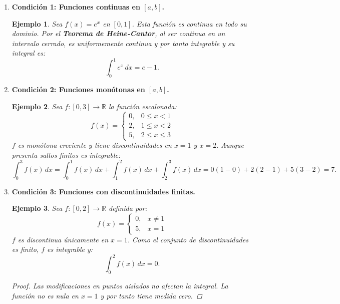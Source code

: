 \documentclass{article}
\newtheorem{ejemplo}{Ejemplo}
\begin{document}
\begin{enumerate}
    \item \textbf{Condición 1: Funciones continuas en \([a, b]\).}
        \begin{ejemplo}
            Sea \( f(x) = e^x \) en \([0, 1]\). Esta función es continua en todo su dominio. Por el \textbf{Teorema de Heine-Cantor}, al ser continua en un intervalo cerrado, es uniformemente continua y por tanto integrable y su integral es:
            \[
            \int_0^1 e^x \, dx = e - 1.
            \]
        \end{ejemplo}
        
    \item \textbf{Condición 2: Funciones monótonas en \([a, b]\).}
        \begin{ejemplo}
            Sea \( f: [0, 3] \to \mathbb{R} \) la función escalonada:
            \[
            f(x) = 
            \begin{cases}
                0, & 0 \leq x < 1 \\
                2, & 1 \leq x < 2 \\
                5, & 2 \leq x \leq 3
            \end{cases}
            \]
            \( f \) es monótona creciente y tiene discontinuidades en \( x = 1 \) y \( x = 2 \). Aunque presenta saltos finitos es integrable:
            \[
            \int_0^3 f(x) \, dx = \int_0^1 f(x) \, dx + \int_1^2 f(x) \, dx + \int_2^3 f(x) \, dx =
            0(1-0) + 2(2-1) + 5(3-2) = 7.
            \]
        \end{ejemplo}

    \item \textbf{Condición 3: Funciones con discontinuidades finitas.}
        \begin{ejemplo}
            Sea \( f: [0, 2] \to \mathbb{R} \) definida por:
            \[
            f(x) = 
            \begin{cases}
                0, & x \neq 1 \\
                5, & x = 1
            \end{cases}
            \]
            \( f \) es discontinua únicamente en \( x = 1 \). Como el conjunto de discontinuidades es finito, \( f \) es integrable y:
            \[
            \int_0^2 f(x) \, dx = 0.
            \]
            \begin{proof}
                Las modificaciones en puntos aislados no afectan la integral. La función no es nula en \( x = 1 \) y por tanto tiene medida cero.
            \end{proof}
        \end{ejemplo}

\end{enumerate}
\end{document}
